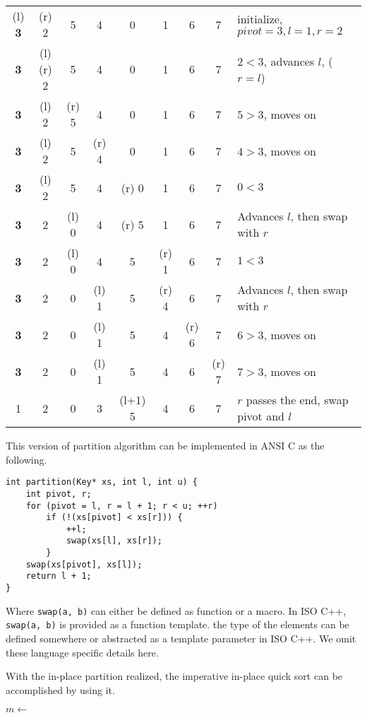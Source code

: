 \documentclass[UTF8]{article}
\begin{document}
\begin{tabular}{ | c c c c c c c c | l |}
\hline
(l) {\bf 3} & (r) 2 & 5 & 4 & 0 & 1 & 6 & 7 & initialize, $pivot = 3, l = 1, r = 2$ \\
{\bf 3} & (l)(r) 2 & 5 & 4 & 0 & 1 & 6 & 7 & $2 < 3$, advances $l$, ($r=l$)\\
{\bf 3} & (l) 2 & (r) 5 & 4 & 0 & 1 & 6 & 7 & $5 > 3$, moves on \\
{\bf 3} & (l) 2 & 5 & (r) 4 & 0 & 1 & 6 & 7 & $4 > 3$, moves on \\
{\bf 3} & (l) 2 & 5 & 4 & (r) 0 & 1 & 6 & 7 & $0 < 3$ \\
{\bf 3} & 2 & (l) 0 & 4 & (r) 5 & 1 & 6 & 7 & Advances $l$, then swap with $r$ \\
{\bf 3} & 2 & (l) 0 & 4 & 5 & (r) 1 & 6 & 7 & $1 < 3$ \\
{\bf 3} & 2 & 0 & (l) 1 & 5 & (r) 4 & 6 & 7 & Advances $l$, then swap with $r$ \\
{\bf 3} & 2 & 0 & (l) 1 & 5 & 4 & (r) 6 & 7 & $6 > 3$, moves on \\
{\bf 3} & 2 & 0 & (l) 1 & 5 & 4 & 6 & (r) 7 & $7 > 3$, moves on \\
1 & 2 & 0 & 3 & (l+1) 5 & 4 & 6 & 7 & $r$ passes the end, swap pivot and $l$ \\
\hline
\end{tabular}

This version of partition algorithm can be implemented in ANSI C as the following.
\lstset{language=C}
\begin{lstlisting}
int partition(Key* xs, int l, int u) {
    int pivot, r;
    for (pivot = l, r = l + 1; r < u; ++r)
        if (!(xs[pivot] < xs[r])) {
            ++l;
            swap(xs[l], xs[r]);
        }
    swap(xs[pivot], xs[l]);
    return l + 1;
}
\end{lstlisting}

Where \verb|swap(a, b)| can either be defined as function or a macro. In ISO C++, \verb|swap(a, b)|
is provided as a function template. the type of the elements can be defined somewhere or abstracted
as a template parameter in ISO C++. We omit these language specific details here.

With the in-place partition realized, the imperative in-place quick sort can be accomplished by using it.

\begin{algorithmic}[1]
    \State $m \gets$ 
    \State {}
    \State {}
  \EndIf
\EndProcedure
\end{algorithmic}
\end{document}
